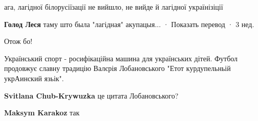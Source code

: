 \begin{itemize}
 

ага, лагідної білорусіїзації не вийшло, не вийде й лагідної українізіції

\begin{itemize}
 
\textbf{Голод Леся} таму што была "лагідная" акупацыя...
 · Показать перевод · 3 нед.
 
Отож бо!
\end{itemize}

 

Український спорт - росифікаційна машина для українських дітей. Футбол
продовжує славну традицію Валєрія Лобановського "Етот курдупельньій укрАинский
язьік".

\begin{itemize}


 
\textbf{Svitlana Chub-Krywuzka} це цитата Лобановського?

 
\textbf{Maksym Karakoz} так


\end{itemize}
\end{itemize}
